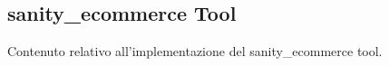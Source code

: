 \subsection{sanity\_ecommerce Tool}

Contenuto relativo all'implementazione del sanity\_ecommerce tool.

